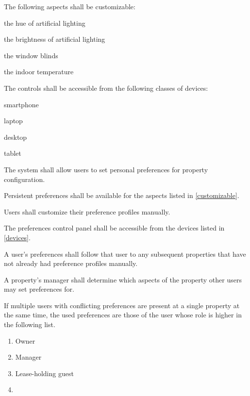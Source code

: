\documentclass[letter,titlepage,oneside,english]{report}
\begin{document}
\begin{fr}
  \begin{fr}
  \item\label{customizable}
    The following aspects shall be customizable:
    \begin{fr}
    \item
      the hue of artificial lighting
    \item
      the brightness of artificial lighting
    \item
      the window blinds
    \item
      the indoor temperature
    \end{fr}
  \item\label{devices}
    The controls shall be accessible from the following classes of devices:
    \begin{fr}
    \item
      smartphone
    \item
      laptop
    \item
      desktop
    \item
      tablet
    \end{fr}
  \end{fr}
\item
  The system shall allow users to set personal preferences for property configuration.
  \begin{fr}
  \item
    Persistent preferences shall be available for the aspects listed in \ref{customizable}.
  \item
    Users shall customize their preference profiles manually.
  \item
    The preferences control panel shall be accessible from the devices listed in \ref{devices}.
  \item
    A user's preferences shall follow that user to any subsequent properties that have not already had preference profiles manually.
  \item
    A property's manager shall determine which aspects of the property other users may set preferences for.
  \item
    If multiple users with conflicting preferences are present at a single property at the same time, the used preferences are those of the user whose role is higher in the following list.
    \begin{enumerate}
    \item
      Owner
    \item
      Manager
    \item
      Lease-holding guest
    \item

\end{enumerate}
\end{fr}
\end{fr}
\end{document}
